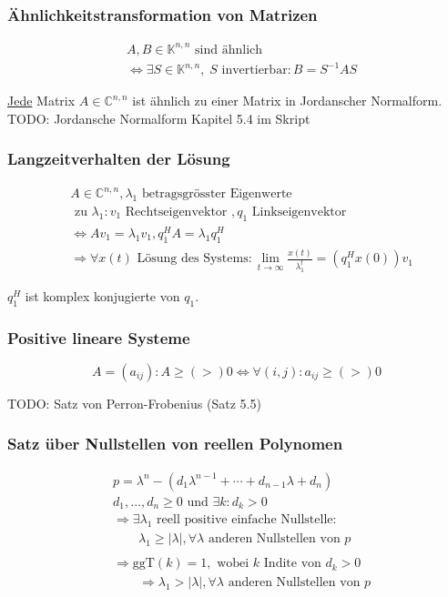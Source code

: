 \documentclass[a4paper]{article}
\begin{document}
\subsubsection{Ähnlichkeitstransformation von Matrizen}
\begin{align*}
	& A, B \in \mathbb{K} ^{n, n} \text{ sind ähnlich } \\
	& \Leftrightarrow \exists
		S \in \mathbb{K} ^{n,n},\; S \text{ invertierbar} :
		B = S ^{-1} A S
\end{align*}

\underline{Jede} Matrix $A \in \mathbb{C} ^{n,n}$ ist ähnlich
zu einer Matrix in Jordanscher Normalform.
\\

TODO: Jordansche Normalform Kapitel 5.4 im Skript

\subsubsection{Langzeitverhalten der Lösung}
\begin{align*}
	& A \in \mathbb{C} ^{n,n}, \lambda_1 \text{ betragsgrösster Eigenwerte } \\
	& \text{ zu } \lambda_1 : v_1 \text{ Rechtseigenvektor }, q_1
	\text{ Linkseigenvektor } \\
	& \Leftrightarrow A v_1 = \lambda_1 v_1, q_1 ^{H} A = \lambda_1 q_1 ^{H} \\
	&\Rightarrow \forall x(t) \text{ Lösung des Systems}:
	\lim_{t \to \infty} \frac{ x(t) }{ \lambda_1 ^{t} }
	= (q_1 ^{H} x(0)) v_1
\end{align*}

$q_1 ^{H}$ ist komplex konjugierte von $q_1$.

\subsubsection{Positive lineare Systeme}
\[
	A = (a_{ij}):
	A \geq (>) 0 \Leftrightarrow \forall (i, j): a_{ij} \geq (>) 0
\] 

TODO: Satz von Perron-Frobenius (Satz 5.5)

\subsubsection{Satz über Nullstellen von reellen Polynomen}
\begin{align*}
	& p = \lambda ^{n} - \left(
		d_1 \lambda ^{n-1} + \cdots + d_{n-1} \lambda + d_n
	\right) \\
	& d_1, ..., d_n \geq 0 \text{ und } 
	\exists k: d_k > 0 \\
	&\Rightarrow \exists \lambda_1 \text{ reell positive einfache Nullstelle}: \\
	& \qquad \lambda_1 \geq | \lambda |, 
	\forall \lambda \text{ anderen Nullstellen von } p \\
	& \\
	&\Rightarrow \text{ggT} ( k ) = 1, \text{ wobei }
	k \text{ Indite von } d_k > 0 \\
	& \qquad \Rightarrow \lambda_1 > | \lambda |, 
	\forall \lambda \text{ anderen Nullstellen von } p
\end{align*}
\end{document}
